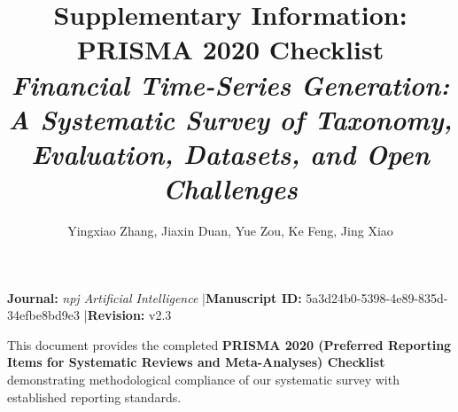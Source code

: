 \documentclass[10pt,a4paper]{article}
\title{\textbf{Supplementary Information: PRISMA 2020 Checklist}\\[0.3em]
\large \textit{Financial Time-Series Generation: A Systematic Survey of Taxonomy, Evaluation, Datasets, and Open Challenges}}
\author{Yingxiao Zhang, Jiaxin Duan, Yue Zou, Ke Feng, Jing Xiao}
\date{}
\begin{document}
\maketitle

\begin{center}
\vspace{-1.5em}
\textbf{Journal:} \textit{npj Artificial Intelligence} \quad|\quad \textbf{Manuscript ID:} 5a3d24b0-5398-4e89-835d-34efbe8bd9e3 \quad|\quad \textbf{Revision:} v2.3
\end{center}

\vspace{1em}
\noindent This document provides the completed \textbf{PRISMA 2020 (Preferred Reporting Items for Systematic Reviews and Meta-Analyses) Checklist} demonstrating methodological compliance of our systematic survey with established reporting standards.
\end{document}
